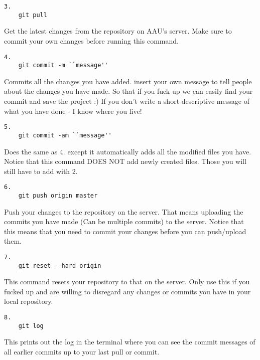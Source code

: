 \begin{verbatim}
3.
	git pull
\end{verbatim}

Get the latest changes from the repository on AAU's server. Make sure to
commit your own changes before running this command.

\begin{verbatim}
4.
	git commit -m ``message''
\end{verbatim}

Commits all the changes you have added. insert your own message to tell people
about the changes you have made. So that if you fuck up we can easily find
your commit and save the project :)\n
If you don't write a short descriptive message of what you have done - I know
where you live!

\begin{verbatim}
5.
	git commit -am ``message''
\end{verbatim}

Does the same as 4. except it automatically adds all the modified files you
have. Notice that this command DOES NOT add newly created files. Those you
will still have to add with 2.

\begin{verbatim}
6.
	git push origin master
\end{verbatim}

Push your changes to the repository on the server. That means uploading the
commits you have made (Can be multiple commits) to the server. Notice that this
means that you need to commit your changes before you can push/upload them.

\begin{verbatim}
7.
	git reset --hard origin
\end{verbatim}

This command resets your repository to that on the server. Only use this if
you fucked up and are willing to disregard any changes or commits you have in
your local repository.

\begin{verbatim}
8.
	git log
\end{verbatim}

This prints out the log in the terminal where you can see the commit messages
of all earlier commits up to your last pull or commit.
